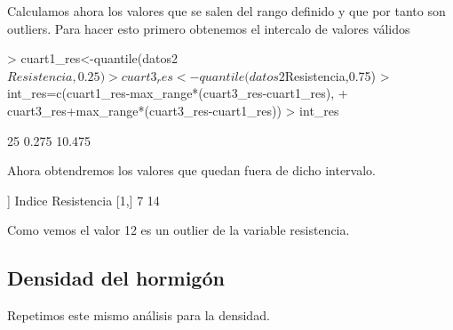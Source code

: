 \documentclass [a4paper] {article}
\begin{document}
Calculamos ahora los valores que se salen del rango definido y que por tanto son outliers.
Para hacer esto primero obtenemos el intercalo de valores válidos
\begin{center}
\begin{Schunk}
\begin{Sinput}
> cuart1_res<-quantile(datos2$Resistencia,0.25)
> cuart3_res<-quantile(datos2$Resistencia,0.75)
> int_res=c(cuart1_res-max_range*(cuart3_res-cuart1_res),
+           cuart3_res+max_range*(cuart3_res-cuart1_res))
> int_res
\end{Sinput}
\begin{Soutput}
   25%
 0.275 10.475 
\end{Soutput}
\end{Schunk}
Ahora obtendremos los valores que quedan fuera de dicho intervalo.
\begin{Schunk}
\begin{Soutput}
[[1]]
     Indice Resistencia
[1,]      7          14
\end{Soutput}
\end{Schunk}
\end{center}
Como vemos el valor 12 es un outlier de la variable resistencia.

\subsection{Densidad del hormigón}
Repetimos este mismo análisis para la densidad.
\end{document}
